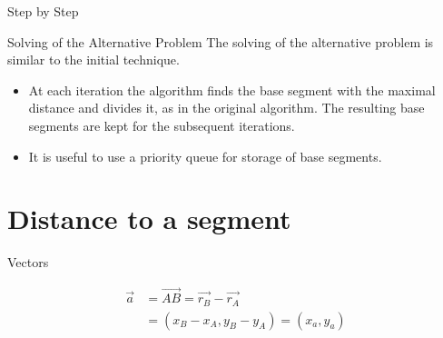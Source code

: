 \documentclass[10pt]{beamer}
\begin{document}
\begin{frame}{Step by Step}
	\begin{figure}[h]
	\end{figure}

\end{frame}

\begin{frame}{Solving of the Alternative Problem}
	The solving of the alternative problem is similar to the initial technique.
	\begin{itemize}
		\item At each iteration the algorithm finds the base segment with the maximal distance
		and divides it, as in the original algorithm. The resulting base segments are kept
		for the subsequent iterations.
		\item It is useful to use a \alert{priority queue} for storage of base segments.  
	\end{itemize}
	
\end{frame}

\section{Distance to a segment}

\begin{frame}{Vectors}

		\begin{figure}[h]
		\end{figure}
		
		\begin{align*}
				\overrightarrow{a} & = \overrightarrow{AB} = \overrightarrow{r_B} - \overrightarrow{r_A} \\
				 & = (x_B-x_A,y_B-y_A) = (x_a,y_a) 	
		\end{align*}


\end{frame}
\end{document}
